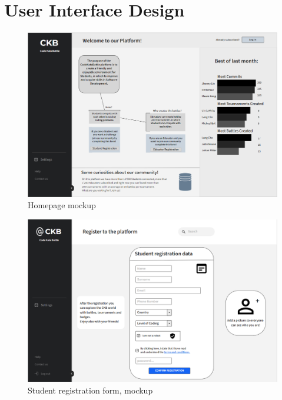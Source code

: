 \documentclass{article}
\begin{document}
{\newpage
\pagestyle{UserInterfaceStyle}
\section{User Interface Design}
\begin{figure}[H]
    \centering
    \hspace*{-2.5cm}\includegraphics[scale=0.7]{UserInterface/Homepage.png}
    \caption{Homepage mockup}
    \label{fig:homepageMockup}
\end{figure}
\begin{figure}[H]
    \centering
    \hspace*{-0.2cm}\includegraphics[scale=0.55]{UserInterface/StudentRegistration.png}
    \caption{Student registration form, mockup}
    \label{fig:studentRegistrationFormMockup}
\end{figure}
\begin{figure}[H]
    \centering

\end{figure}}
\end{document}
